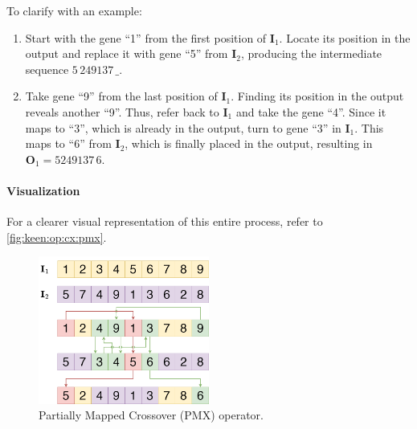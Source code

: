     To clarify with an example:

    \begin{enumerate}
      \item Start with the gene \enquote{1} from the first position of 
        \(\mathbf{I}_1\). 
        Locate its position in the output and replace it with gene \enquote{5} 
        from \(\mathbf{I}_2\), producing the intermediate sequence 
        \(5\,249137\,\_\).
      \item Take gene \enquote{9} from the last position of \(\mathbf{I}_1\). 
        Finding its position in the output reveals another \enquote{9}. Thus, 
        refer back to \(\mathbf{I}_1\) and take the gene \enquote{4}. Since it 
        maps to \enquote{3}, which is already in the output, turn to gene 
        \enquote{3} in \(\mathbf{I}_1\). This maps to \enquote{6} from 
        \(\mathbf{I}_2\), which is finally placed in the output, resulting in 
        \(\textbf{O}_1 = 5249137\,6\).
    \end{enumerate}

  \paragraph{Visualization}
    For a clearer visual representation of this entire process, refer to \vref{fig:keen:op:cx:pmx}.

    \begin{figure}[ht!]
      \centering
      \includegraphics[width=0.5\textwidth]{img/keen/PMX.png}
      \caption{Partially Mapped Crossover (PMX) operator.}
      \label{fig:keen:op:cx:pmx}
    \end{figure}
